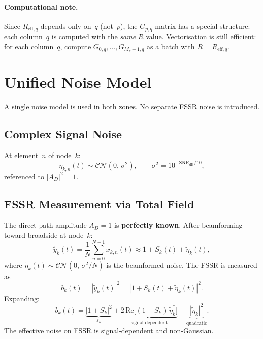 \documentclass[11pt,a4paper]{article}
\begin{document}
\paragraph{Computational note.}
Since $R_{\mathrm{eff},q}$ depends only on~$q$ (not~$p$), the
$G_{p,q}$ matrix has a special structure: each column~$q$ is computed
with the \emph{same} $R$ value.  Vectorisation is still efficient:
for each column~$q$, compute $G_{0,q},\ldots,G_{M_z-1,q}$ as a
batch with $R=R_{\mathrm{eff},q}$.

\section{Unified Noise Model}
\label{sec:noise}

A single noise model is used in both zones.  No separate FSSR noise
is introduced.

\subsection{Complex Signal Noise}
At element~$n$ of node~$k$:
\begin{equation}
  \eta_{k,n}(t) \sim \mathcal{CN}(0,\,\sigma^2),
  \qquad
  \sigma^2 = 10^{-\mathrm{SNR}_{\mathrm{dB}}/10},
  \label{eq:noise_def}
\end{equation}
referenced to $|A_D|^2=1$.

\subsection{FSSR Measurement via Total Field}
\label{sec:fssr_measurement}

The direct-path amplitude $A_D=1$ is \textbf{perfectly known}.  After
beamforming toward broadside at node~$k$:
\begin{equation}
  \tilde{y}_k(t) = \frac{1}{N}\sum_{n=0}^{N-1} x_{k,n}(t)
  \approx 1 + S_k(t) + \tilde{\eta}_k(t),
  \label{eq:beamformed_model}
\end{equation}
where
$\tilde{\eta}_k(t) \sim \mathcal{CN}(0,\,\sigma^2/N)$
is the beamformed noise.  The FSSR is measured as
\begin{equation}
  \boxed{b_k(t) = |\tilde{y}_k(t)|^2
  = |1 + S_k(t) + \tilde{\eta}_k(t)|^2.}
  \label{eq:fssr_measured}
\end{equation}
Expanding:
\begin{equation}
  b_k(t) = \underbrace{|1{+}S_k|^2}_{\varepsilon_k}
  + \underbrace{2\,\mathrm{Re}\!\bigl[(1{+}S_k)\,
  \tilde{\eta}_k^*\bigr]}_{\text{signal-dependent}}
  + \underbrace{|\tilde{\eta}_k|^2}_{\text{quadratic}}.
  \label{eq:fssr_expanded}
\end{equation}
The effective noise on FSSR is signal-dependent and non-Gaussian.
\end{document}
